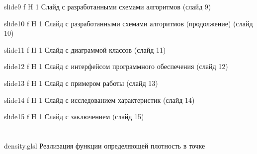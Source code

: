\begin{appendices}
	{slide9} %
	{f} %
	{H} %
	{1\textwidth} %
	{Слайд с разработанными схемами алгоритмов (слайд 9)} %
	
	{slide10} %
	{f} %
	{H} %
	{1\textwidth} %
	{Слайд с разработанными схемами алгоритмов (продолжение) (слайд 10)} %
	
	{slide11} %
	{f} %
	{H} %
	{1\textwidth} %
	{Слайд с диаграммой классов (слайд 11)} %
	
	{slide12} %
	{f} %
	{H} %
	{1\textwidth} %
	{Слайд с интерфейсом программного обеспечения (слайд 12)} %
	
	{slide13} %
	{f} %
	{H} %
	{1\textwidth} %
	{Слайд с примером работы (слайд 13)} %
	
	{slide14} %
	{f} %
	{H} %
	{1\textwidth} %
	{Слайд с исследованием характеристик (слайд 14)} %
	
	{slide15} %
	{f} %
	{H} %
	{1\textwidth} %
	{Слайд с заключением (слайд 15)} %
	
	\chapter{}
	\label{app:listings}
	
	{density.glsl} %
	{} %
	{Реализация функции определяющей плотность в точке} %
	

\end{appendices}
